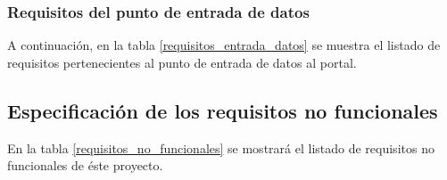 \subsubsection{Requisitos del punto de entrada de datos}
A continuación, en la tabla \ref{requisitos_entrada_datos} se muestra el listado de requisitos pertenecientes al punto de entrada de datos al portal.



\subsection{Especificación de los requisitos no funcionales}
\label{especificacion_requisitos_no_funcionales}
En la tabla \ref{requisitos_no_funcionales} se mostrará el listado de requisitos no funcionales de éste proyecto.
